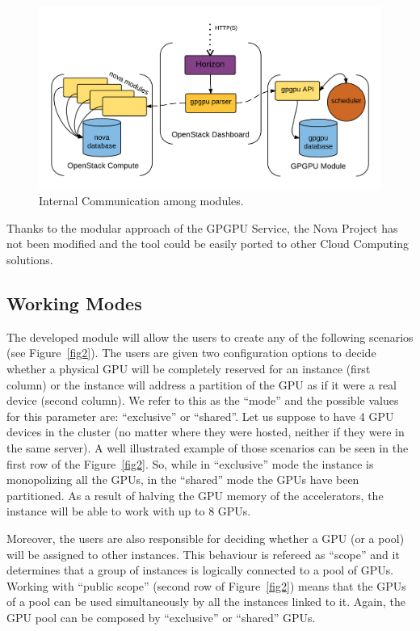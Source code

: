\documentclass[a4paper,twoside]{article}
\begin{document}
\begin{figure}[htb]
  \centering
  \includegraphics[width=\linewidth]{images/os2.png}
  \caption{Internal Communication among modules.}
  \label{fig:internal}
\end{figure}

Thanks to the modular approach of the GPGPU Service, the Nova Project has not been modified and the tool could be easily ported to other Cloud Computing solutions.

\subsection{Working Modes}
The developed module will allow the users to create any of the following scenarios (see Figure~\ref{fig2}). 
The users are given two configuration options to decide whether a physical GPU will be completely reserved for an instance (first column) or the instance will address a partition of the GPU as if it were a real device (second column).
We refer to this as the ``mode'' and the possible values for this parameter are: ``exclusive'' or ``shared''. 
Let us suppose to have 4 GPU devices in the cluster (no matter where they were hosted, neither if they were in the same server). 
A well illustrated example of those scenarios can be seen in the first row of the  Figure~\ref{fig2}.
So, while in ``exclusive'' mode the instance is monopolizing all the GPUs, in the ``shared'' mode the GPUs have been partitioned. 
As a result of halving the GPU memory of the accelerators, the instance will be able to work with up to 8 GPUs.

Moreover, the users are also responsible for deciding whether a GPU (or a pool) will be assigned to other instances. 
This behaviour is refereed as ``scope'' and it determines that a group of instances is logically connected to a pool of GPUs.
Working with ``public scope'' (second row of Figure~\ref{fig2}) means that the GPUs of a pool can be used simultaneously by all the instances linked to it.
Again, the GPU pool can be composed by ``exclusive'' or ``shared'' GPUs.
\end{document}
